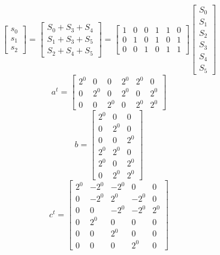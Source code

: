 \documentclass{article}%
\begin{document}
\[%
\left[\begin{matrix}s_{0}\\s_{1}\\s_{2}\end{matrix}\right] = \left[\begin{matrix}S_{0} + S_{3} + S_{4}\\S_{1} + S_{3} + S_{5}\\S_{2} + S_{4} + S_{5}\end{matrix}\right] = \left[\begin{matrix}1 & 0 & 0 & 1 & 1 & 0\\0 & 1 & 0 & 1 & 0 & 1\\0 & 0 & 1 & 0 & 1 & 1\end{matrix}\right] \left[\begin{matrix}S_{0}\\S_{1}\\S_{2}\\S_{3}\\S_{4}\\S_{5}\end{matrix}\right]%
\]%
\[%
a^{t} = \left[\begin{matrix}2^{0} & 0 & 0 & 2^{0} & 2^{0} & 0\\0 & 2^{0} & 0 & 2^{0} & 0 & 2^{0}\\0 & 0 & 2^{0} & 0 & 2^{0} & 2^{0}\end{matrix}\right]%
\]%
\[%
b = \left[\begin{matrix}2^{0} & 0 & 0\\0 & 2^{0} & 0\\0 & 0 & 2^{0}\\2^{0} & 2^{0} & 0\\2^{0} & 0 & 2^{0}\\0 & 2^{0} & 2^{0}\end{matrix}\right]%
\]%
\[%
c^{t} = \left[\begin{matrix}2^{0} & - 2^{0} & - 2^{0} & 0 & 0\\0 & - 2^{0} & 2^{0} & - 2^{0} & 0\\0 & 0 & - 2^{0} & - 2^{0} & 2^{0}\\0 & 2^{0} & 0 & 0 & 0\\0 & 0 & 2^{0} & 0 & 0\\0 & 0 & 0 & 2^{0} & 0\end{matrix}\right]%
\]%
\end{document}
